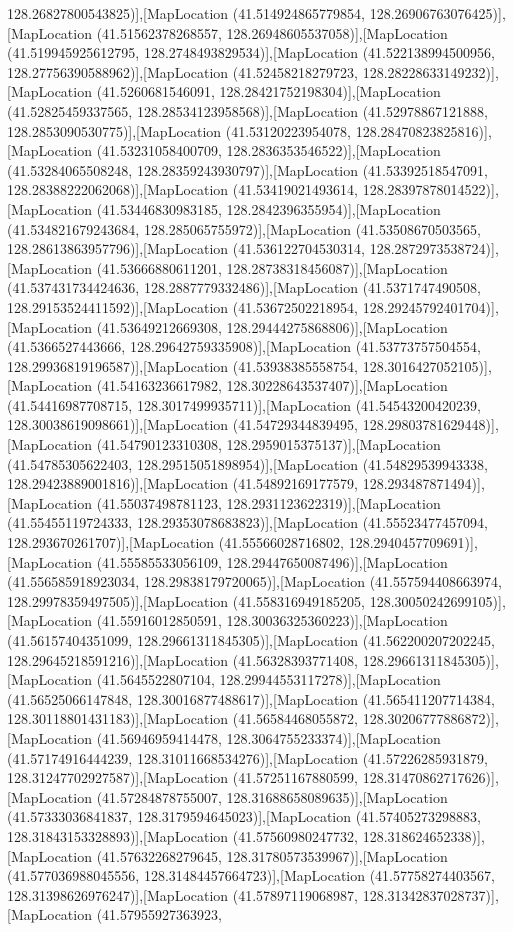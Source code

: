 128.26827800543825)],[MapLocation (41.514924865779854, 128.26906763076425)],[MapLocation (41.51562378268557, 128.26948605537058)],[MapLocation (41.519945925612795, 128.2748493829534)],[MapLocation (41.522138994500956, 128.27756390588962)],[MapLocation (41.52458218279723, 128.28228633149232)],[MapLocation (41.5260681546091, 128.28421752198304)],[MapLocation (41.52825459337565, 128.28534123958568)],[MapLocation (41.52978867121888, 128.2853090530775)],[MapLocation (41.53120223954078, 128.28470823825816)],[MapLocation (41.53231058400709, 128.2836353546522)],[MapLocation (41.53284065508248, 128.28359243930797)],[MapLocation (41.53392518547091, 128.28388222062068)],[MapLocation (41.53419021493614, 128.28397878014522)],[MapLocation (41.53446830983185, 128.2842396355954)],[MapLocation (41.534821679243684, 128.285065755972)],[MapLocation (41.53508670503565, 128.28613863957796)],[MapLocation (41.536122704530314, 128.2872973538724)],[MapLocation (41.53666880611201, 128.28738318456087)],[MapLocation (41.537431734424636, 128.2887779332486)],[MapLocation (41.5371747490508, 128.29153524411592)],[MapLocation (41.53672502218954, 128.29245792401704)],[MapLocation (41.53649212669308, 128.29444275868806)],[MapLocation (41.5366527443666, 128.29642759335908)],[MapLocation (41.53773757504554, 128.29936819196587)],[MapLocation (41.53938385558754, 128.3016427052105)],[MapLocation (41.54163236617982, 128.30228643537407)],[MapLocation (41.54416987708715, 128.3017499935711)],[MapLocation (41.54543200420239, 128.30038619098661)],[MapLocation (41.54729344839495, 128.29803781629448)],[MapLocation (41.54790123310308, 128.2959015375137)],[MapLocation (41.54785305622403, 128.29515051898954)],[MapLocation (41.54829539943338, 128.29423889001816)],[MapLocation (41.54892169177579, 128.293487871494)],[MapLocation (41.55037498781123, 128.2931123622319)],[MapLocation (41.55455119724333, 128.29353078683823)],[MapLocation (41.55523477457094, 128.293670261707)],[MapLocation (41.55566028716802, 128.2940457709691)],[MapLocation (41.55585533056109, 128.29447650087496)],[MapLocation (41.556585918923034, 128.29838179720065)],[MapLocation (41.557594408663974, 128.29978359497505)],[MapLocation (41.558316949185205, 128.30050242699105)],[MapLocation (41.55916012850591, 128.30036325360223)],[MapLocation (41.56157404351099, 128.29661311845305)],[MapLocation (41.562200207202245, 128.29645218591216)],[MapLocation (41.56328393771408, 128.29661311845305)],[MapLocation (41.5645522807104, 128.29944553117278)],[MapLocation (41.56525066147848, 128.30016877488617)],[MapLocation (41.565411207714384, 128.30118801431183)],[MapLocation (41.56584468055872, 128.30206777886872)],[MapLocation (41.56946959414478, 128.3064755233374)],[MapLocation (41.57174916444239, 128.31011668534276)],[MapLocation (41.57226285931879, 128.31247702927587)],[MapLocation (41.57251167880599, 128.31470862717626)],[MapLocation (41.57284878755007, 128.31688658089635)],[MapLocation (41.57333036841837, 128.3179594645023)],[MapLocation (41.57405273298883, 128.31843153328893)],[MapLocation (41.57560980247732, 128.318624652338)],[MapLocation (41.57632268279645, 128.31780573539967)],[MapLocation (41.577036988045556, 128.31484457664723)],[MapLocation (41.57758274403567, 128.31398626976247)],[MapLocation (41.57897119068987, 128.31342837028737)],[MapLocation (41.57955927363923, 